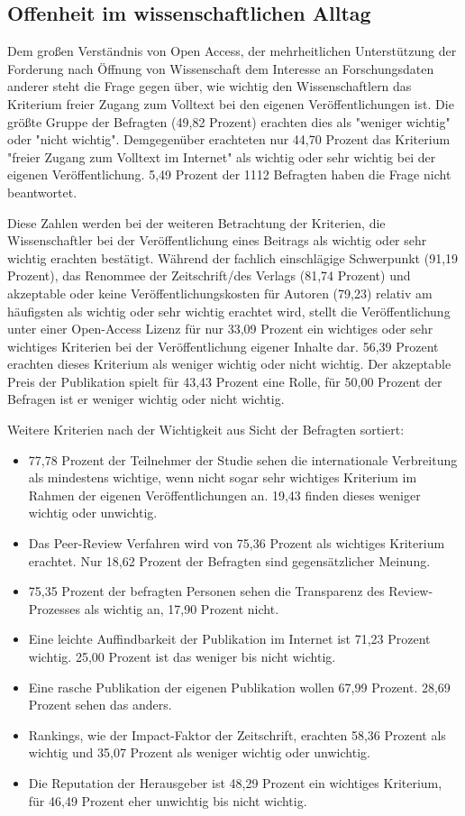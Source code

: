 \subsection{Offenheit im wissenschaftlichen Alltag}

Dem großen Verständnis von Open Access, der mehrheitlichen Unterstützung der Forderung nach Öffnung von Wissenschaft dem Interesse an Forschungsdaten anderer steht die Frage gegen über, wie wichtig den Wissenschaftlern das Kriterium freier Zugang zum Volltext bei den eigenen Veröffentlichungen ist. Die größte Gruppe der Befragten (49,82 Prozent) erachten dies als "weniger wichtig" oder "nicht wichtig". Demgegenüber erachteten nur 44,70 Prozent das Kriterium "freier Zugang zum Volltext im Internet" als wichtig oder sehr wichtig bei der eigenen Veröffentlichung. 5,49 Prozent der 1112 Befragten haben die Frage nicht beantwortet.

Diese Zahlen werden bei der weiteren Betrachtung der Kriterien, die Wissenschaftler bei der Veröffentlichung eines Beitrags als wichtig oder sehr wichtig erachten bestätigt. Während der fachlich einschlägige Schwerpunkt (91,19 Prozent), das Renommee der Zeitschrift/des Verlags (81,74 Prozent) und akzeptable oder keine Veröffentlichungskosten für Autoren (79,23) relativ am häufigsten als wichtig oder sehr wichtig erachtet wird, stellt die Veröffentlichung unter einer Open-Access Lizenz für nur 33,09 Prozent ein wichtiges oder sehr wichtiges Kriterien bei der Veröffentlichung eigener Inhalte dar. 56,39 Prozent erachten dieses Kriterium als weniger wichtig oder nicht wichtig. Der akzeptable Preis der Publikation spielt für 43,43 Prozent eine Rolle, für 50,00 Prozent der Befragen ist er weniger wichtig oder nicht wichtig.

Weitere Kriterien nach der Wichtigkeit aus Sicht der Befragten sortiert:
\begin{itemize}
\item 77,78 Prozent der Teilnehmer der Studie sehen die internationale Verbreitung als mindestens wichtige, wenn nicht sogar sehr wichtiges Kriterium im Rahmen der eigenen Veröffentlichungen an. 19,43 finden dieses weniger wichtig oder unwichtig.
\item Das Peer-Review Verfahren wird von 75,36 Prozent als wichtiges Kriterium erachtet. Nur 18,62 Prozent der Befragten sind gegensätzlicher Meinung.
\item 75,35 Prozent der befragten Personen sehen die Transparenz des Review-Prozesses als wichtig an, 17,90 Prozent nicht.
\item Eine leichte Auffindbarkeit der Publikation im Internet ist 71,23 Prozent wichtig. 25,00 Prozent ist das weniger bis nicht wichtig.
\item Eine rasche Publikation der eigenen Publikation wollen 67,99 Prozent. 28,69 Prozent sehen das anders.
\item Rankings, wie der Impact-Faktor der Zeitschrift, erachten 58,36 Prozent als wichtig und 35,07 Prozent als weniger wichtig oder unwichtig.
\item Die Reputation der Herausgeber ist 48,29 Prozent ein wichtiges Kriterium, für 46,49 Prozent eher unwichtig bis nicht wichtig.
\end{itemize}

